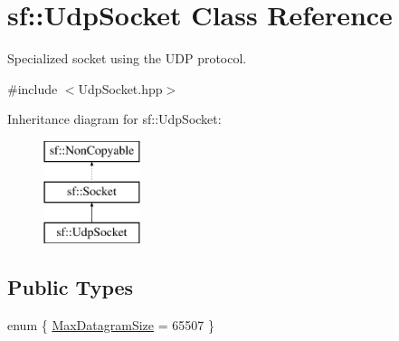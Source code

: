 \hypertarget{classsf_1_1_udp_socket}{}\section{sf\+:\+:Udp\+Socket Class Reference}
\label{classsf_1_1_udp_socket}


Specialized socket using the U\+DP protocol.  




{\ttfamily \#include $<$Udp\+Socket.\+hpp$>$}

Inheritance diagram for sf\+:\+:Udp\+Socket\+:\begin{figure}[H]
\begin{center}
\leavevmode
\includegraphics[height=3.000000cm]{classsf_1_1_udp_socket}
\end{center}
\end{figure}
\subsection*{Public Types}
\begin{DoxyCompactItemize}
\item 
enum \{ \mbox{\hyperlink{classsf_1_1_udp_socket_a8ad087820b1ae07267858212f3d0fac5a728a7d33027bee0d65f70f964dd9c9eb}{Max\+Datagram\+Size}} = 65507
 \}
\end{DoxyCompactItemize}
